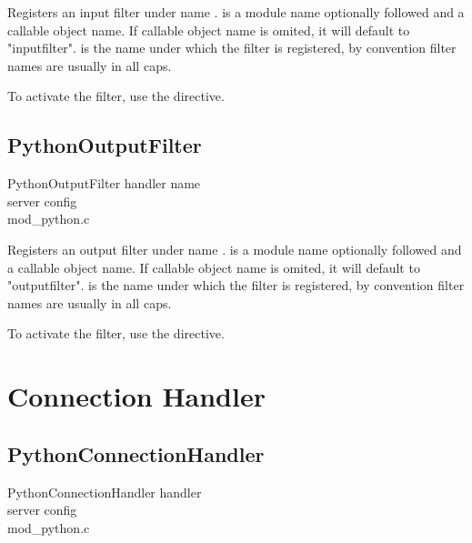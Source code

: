 Registers an input filter  under name
.  is a module name optionally followed
\code{::} and a callable object name. If callable object name is
omited, it will default to "inputfilter".  is the name under
which the filter is registered, by convention filter names are usually
in all caps.

To activate the filter, use the  directive.

\subsection{PythonOutputFilter\label{dir-filter-of}}

PythonOutputFilter handler name\\
server config\\
mod_python.c

Registers an output filter  under name
.  is a module name optionally followed
\code{::} and a callable object name. If callable object name is
omited, it will default to "outputfilter".  is the name under
which the filter is registered, by convention filter names are usually
in all caps.

To activate the filter, use the  directive.

\section{Connection Handler\label{dir-conn}}

\subsection{PythonConnectionHandler\label{dir-conn-ch}}

PythonConnectionHandler handler\\
server config\\
mod_python.c

